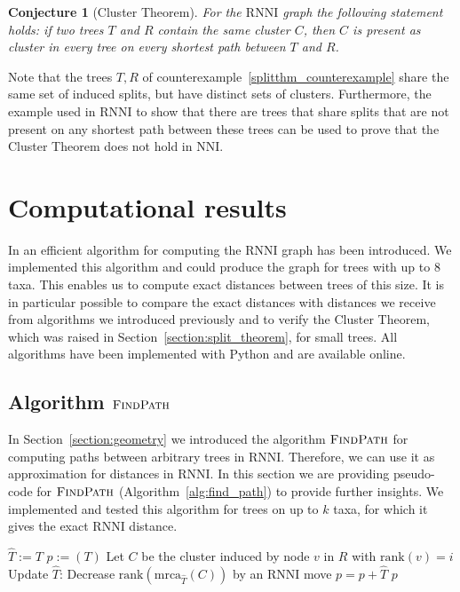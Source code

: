 \documentclass{amsart}
\newcommand{\mrca}{\mathrm{mrca}}
\newcommand{\rank}{\mathrm{rank}}
\newcommand{\nni}{\mathrm{NNI}}
\newcommand{\rnni}{\mathrm{RNNI}}
\newcommand{\findpath}{\textsc{FindPath}}
\newtheorem{conjecture}[definition]{Conjecture}
\begin{document}
\begin{conjecture}[Cluster Theorem]
	For the $\rnni$ graph the following statement holds:
	if two trees $T$ and $R$ contain the same cluster $C$, then $C$ is present as cluster in every tree on every shortest path between $T$ and $R$.
	\label{conjecture:cluster_theorem}
\end{conjecture}

Note that the trees $T, R$ of counterexample~\ref{splitthm_counterexample} share the same set of induced splits, but have distinct sets of clusters.
Furthermore, the example used in $\rnni$ to show that there are trees that share splits that are not present on any shortest path between these trees can be used to prove that the Cluster Theorem does not hold in $\nni$.

\section{Computational results}
\label{section:computation}

In \autocite{Gavryushkin2018-ol} an efficient algorithm for computing the $\rnni$ graph has been introduced.
We implemented this algorithm and could produce the graph for trees with up to $8$ taxa.
This enables us to compute exact distances between trees of this size.
It is in particular possible to compare the exact distances with distances we receive from algorithms we introduced previously and to verify the Cluster Theorem, which was raised in Section~\ref{section:split_theorem}, for small trees.
All algorithms have been implemented with Python and are available online. 

\subsection{Algorithm $\findpath$}
\label{section:computation_findpath}

In Section~\ref{section:geometry} we introduced the algorithm $\findpath$ for computing paths between arbitrary trees in $\rnni$.
Therefore, we can use it as approximation for distances in $\rnni$.
In this section we are providing pseudo-code for $\findpath$ (Algorithm~\ref{alg:find_path}) to provide further insights.
We implemented and tested this algorithm for trees on up to $k$ taxa, for which it gives the exact $\rnni$ distance. 

\begin{algorithm}[H]
\caption{$\findpath$($T,R$)}
\label{alg:find_path}
\begin{algorithmic}[1]
	\STATE $\hat{T} := T$
	\STATE $p := (T)$
		\STATE Let $C$ be the cluster induced by node $v$ in $R$ with $\rank(v) = i$
		\WHILE {$\rank(\mrca_{\hat{T}}(C))>i$}
			\STATE Update $\hat{T}$: Decrease $\rank(\mrca_{\hat{T}}(C))$ by an $\rnni$ move \label{alg:line:move_set_down}
			\STATE $p = p+\hat{T}$
		\ENDWHILE
	\ENDFOR
	\RETURN $p$
\end{algorithmic}
\end{algorithm}
\end{document}
